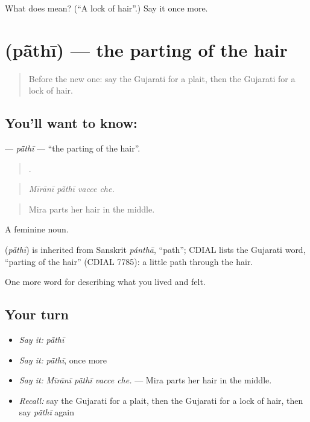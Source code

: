 \begin{tcolorbox}[breakable,colback=teal!4,colframe=teal!35!black,title={Before you move on}]
What does  mean? (\textquotedblleft{}A lock of hair\textquotedblright{}.) Say it once more.
\end{tcolorbox}
\section[\texorpdfstring{\gu{પાંથી} (pā̃thī)}{પાંથી (pā̃thī)}]{ (pā̃thī) — the parting of the hair}

\label{lesson:GU-C470-pathi}



\begin{quote}
Before the new one: say the Gujarati for a plait, then the Gujarati for a lock of hair.
\end{quote}

\subsection*{You'll want to know: }
\textbf{} — \emph{pā̃thī} — \textquotedblleft{}the parting of the hair\textquotedblright{}.

\begin{quote}
   .
\end{quote}

\begin{quote}
\emph{Mīrānī pā̃thī vacce che.}
\end{quote}

\begin{quote}
Mira parts her hair in the middle.
\end{quote}

A feminine noun.

\begin{cousinweb}
\textbf{} (\emph{pā̃thī}) is inherited from Sanskrit \emph{pánthā}, \textquotedblleft{}path\textquotedblright{}; CDIAL lists the Gujarati word, \textquotedblleft{}parting of the hair\textquotedblright{} (CDIAL 7785): a little path through the hair.
\end{cousinweb}

\begin{grammarlens}[title={What you've built}]
One more word for describing what you lived and felt.
\end{grammarlens}

\subsection*{Your turn}
\begin{itemize}
\raggedright
  \item \emph{Say it:} \emph{pā̃thī}
  \item \emph{Say it:} \emph{pā̃thī}, once more
  \item \emph{Say it:} \emph{Mīrānī pā̃thī vacce che.} — Mira parts her hair in the middle.
  \item \emph{Recall:} say the Gujarati for a plait, then the Gujarati for a lock of hair, then say \emph{pā̃thī} again
\end{itemize}

